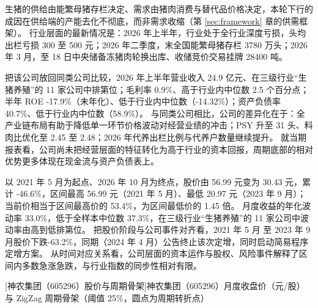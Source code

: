  生猪的供给由能繁母猪存栏决定、需求由猪肉消费与替代品价格决定，本轮下行的成因在供给端的产能去化不彻底，而非需求收缩（第 \ref{sec:framework} 章的供需框架）。 行业层面的最新情况是：2026 年上半年，行业处于全行业深度亏损，头均出栏亏损 300 至 500 元；2026 年二季度，末全国能繁母猪存栏 3780 万头；2026 年 3 月，至 18 日中央储备冻猪肉轮换出库、收储竞价交易挂牌 28400 吨。

 把该公司放回同类公司比较，2026 年上半年营业收入 24.9 亿元、在三级行业“生猪养殖”的 11 家公司中排第位；毛利率 0.9\%、高于行业内中位数 2.5 个百分点；半年 ROE -17.9\%（未年化）、低于行业内中位数（-14.32\%）；资产负债率 40.7\%、低于行业内中位数（58.9\%）。 与同类公司相比，公司的差异化在于：全产业链布局有助于降低单一环节价格波动对经营业绩的冲击；PSY 升至 31 头、料肉比优化至 2.45 至 2.48；2026 年代养出栏比例与代养户数量继续提升。 就当期报表看，公司尚未把经营层面的特征转化为高于行业的资本回报，周期底部的相对优势更多体现在现金流与资产负债表上。

 以 2021 年 5 月为起点、2026 年 10 月为终点，股价由 56.99 元变为 30.43 元，累计 -46.6\%，区间最高 56.99 元（2021 年 5 月）、最低 20.97 元（2023 年 9 月）；当前价相当于区间最高价的 53.4\%，为区间最低价的 1.45 倍。 月度收益的年化波动率 33.0\%，低于全样本中位数 37.3\%，在三级行业“生猪养殖”的 11 家公司中波动率由高到低排第位。 把股价阶段与公司事件对齐看，2021 年 5 月 至 2023 年 9 月股价下跌-63.2\%，同期（2024 年 4 月）公告终止该次定增，同时启动简易程序定增方案。 从时间对应关系看，公司层面的资本运作与股权、风险事件解释了区间内多数急涨急跌，与行业指数的同步性相对有限。

\begin{center}
\begin{minipage}{\textwidth}\centering
{}

[神农集团（605296）股价与周期骨架]{神农集团（605296）月度收盘价（元/股）与 ZigZag 周期骨架（阈值 25\%，圆点为周期转折点）}
\end{minipage}
\end{center}

